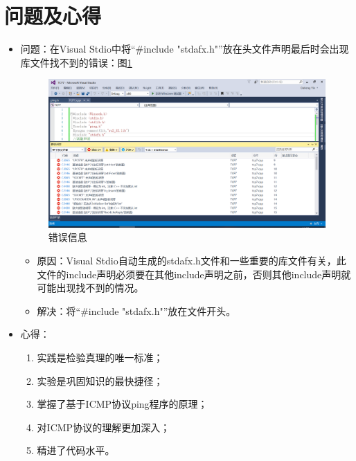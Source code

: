 \documentclass[a4paper]{ctexrep}
\begin{document}
\section{问题及心得}
	\begin{itemize}
		\item 问题：在Visual Stdio中将“\#include "stdafx.h"”放在头文件声明最后时会出现库文件找不到的错误：图\ref{error}
		\begin{figure}[htbp]
			\centering
			\includegraphics [width=1\textwidth]{figure//err1.png}
			\caption{错误信息}\label{error}
		\end{figure}
	\begin{itemize}
		\item 原因：Visual Stdio自动生成的stdafx.h文件和一些重要的库文件有关，此文件的include声明必须要在其他include声明之前，否则其他include声明就可能出现找不到的情况。
		\item 解决：将“\#include "stdafx.h"”放在文件开头。
	\end{itemize}
		\item 心得：\begin{enumerate}
			\item 实践是检验真理的唯一标准；
			\item 实验是巩固知识的最快捷径；
			\item 掌握了基于ICMP协议ping程序的原理；
			\item 对ICMP协议的理解更加深入；
			\item 精进了代码水平。
		\end{enumerate}
	\end{itemize}
\end{document}
